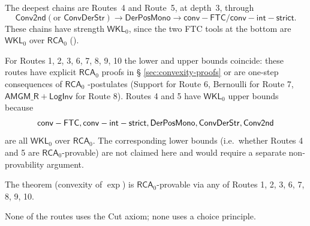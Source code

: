 \documentclass[11pt,reqno]{amsart}
\makeatletter
\theoremstyle{redplain}
\renewenvironment{quotation}
{\list{}{\listparindent\z@
		\itemindent\z@
		\rightmargin\leftmargin
		\parsep\z@}	\item\relax}
{\endlist}
\numberwithin{equation}{section}
\makeatother
\begin{document}
\begin{quotation}
The deepest chains are Routes~4 and Route~5, at depth~3, through 
\begin{equation*}
\mathsf{Conv2nd}(\text{or }\mathsf{ConvDerStr})\rightarrow \mathsf{DerPosMono%
}\rightarrow \mathsf{conv-FTC}/\mathsf{conv-int-strict}.
\end{equation*}%
These chains have strength $\mathsf{WKL}_{0}$, since the two FTC tools at
the bottom are $\mathsf{WKL}_{0}$ over $\mathsf{RCA}_{0}$ (\cite[II.7, IV.2.3%
]{Simpson2009}). \noindent

\medskip
\end{quotation}


\begin{center}
{\small \noindent }
\end{center}

\begin{quotation}
\medskip \noindent For Routes 1, 2, 3, 6, 7, 8, 9, 10 the lower and upper
bounds coincide: these routes have explicit $\mathsf{RCA}_{0}$ proofs in \S %
\ref{sec:convexity-proofs} or are one-step consequences of $\mathsf{RCA}_{0}$%
-postulates (\textsf{Support} for Route 6, \textsf{Bernoulli} for Route 7, $%
\mathsf{AMGM\_R} + \mathsf{LogInv}$ for Route 8). Routes 4 and 5 have $%
\mathsf{WKL}_{0}$ upper bounds because 
\begin{equation*}
\mathsf{conv-FTC},\mathsf{conv-int-strict},\mathsf{DerPosMono},\mathsf{%
ConvDerStr},\mathsf{Conv2nd}
\end{equation*}%
are all $\mathsf{WKL}_{0}$ over $\mathsf{RCA}_{0}$. The corresponding lower
bounds (i.e.\ whether Routes 4 and 5 are $\mathsf{RCA}_{0}$-provable) are
not claimed here and would require a separate non-provability argument.

\noindent The theorem (convexity of $\exp $) is $\mathsf{RCA}_{0}$-provable
via any of Routes 1, 2, 3, 6, 7, 8, 9, 10.

None of the routes uses the Cut axiom; none uses a choice principle.
\end{quotation}
\end{document}
